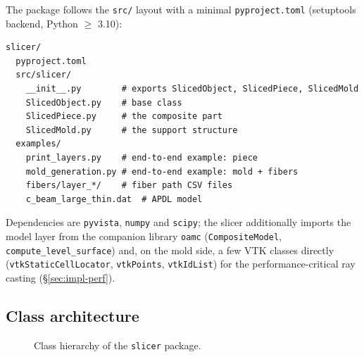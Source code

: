 The package follows the \texttt{src/} layout with a minimal
\texttt{pyproject.toml} (setuptools backend, Python $\ge$ 3.10):
\begin{lstlisting}[caption={Package layout.}]
slicer/
  pyproject.toml
  src/slicer/
    __init__.py        # exports SlicedObject, SlicedPiece, SlicedMold
    SlicedObject.py    # base class
    SlicedPiece.py     # the composite part
    SlicedMold.py      # the support structure
  examples/
    print_layers.py    # end-to-end example: piece
    mold_generation.py # end-to-end example: mold + fibers
    fibers/layer_*/    # fiber path CSV files
    c_beam_large_thin.dat  # APDL model
\end{lstlisting}
Dependencies are \texttt{pyvista}, \texttt{numpy} and \texttt{scipy};
the slicer additionally imports the model layer from the companion
library \texttt{oamc} (\texttt{CompositeModel},
\texttt{compute\_level\_surface}) and, on the mold side, a few VTK
classes directly (\texttt{vtkStaticCellLocator}, \texttt{vtkPoints},
\texttt{vtkIdList}) for the performance-critical ray casting
(\S\ref{sec:impl-perf}).

\subsection{Class architecture}\label{sec:impl-arch}

\begin{figure}[htbp]
\centering
{}
\caption{Class hierarchy of the \texttt{slicer} package.}
\label{fig:classes}
\end{figure}


